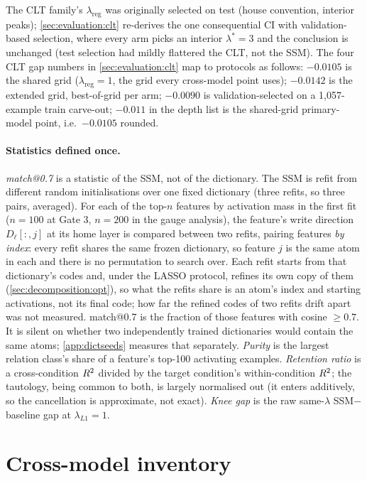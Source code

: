 The CLT
family's $\lambda_{\mathrm{reg}}$ was originally selected on test (house
convention, interior peaks); \cref{sec:evaluation:clt} re-derives the one
consequential CI with validation-based selection, where every arm picks an
interior $\lambda^{*}{=}3$ and the conclusion is unchanged (test selection had
mildly flattered the CLT, not the SSM). The four CLT gap numbers in
\cref{sec:evaluation:clt} map to protocols as follows: $-0.0105$ is the shared
grid ($\lambda_{\mathrm{reg}}{=}1$, the grid every cross-model point uses);
$-0.0142$ is the extended grid, best-of-grid per arm; $-0.0090$ is
validation-selected on a 1{,}057-example train carve-out; $-0.011$ in the
depth list is the shared-grid primary-model point, i.e.\ $-0.0105$ rounded.

\paragraph{Statistics defined once.}
\emph{match@0.7} is a statistic of the SSM, not of the dictionary. The SSM is
refit from different random initialisations over one fixed dictionary (three
refits, so three pairs, averaged). For each of the top-$n$ features by
activation mass in the first fit ($n = 100$ at Gate 3, $n = 200$ in the gauge
analysis), the feature's write direction $D_\ell[:, j]$ at its home layer is
compared between two refits, pairing features \emph{by index}: every refit
shares the same frozen dictionary, so feature $j$ is the same atom in each
and there is no permutation to search over. Each refit starts from that
dictionary's codes and, under the LASSO protocol, refines its own copy of
them (\cref{sec:decomposition:opt}), so what the refits share is an atom's
index and starting activations, not its final code; how far the refined
codes of two refits drift apart was not measured. match@0.7 is the fraction
of those features with cosine $\ge 0.7$. It is silent on whether two
independently trained dictionaries would contain the same atoms;
\cref{app:dictseeds} measures that separately.
\emph{Purity} is the largest relation class's share of a feature's top-100
activating examples. \emph{Retention ratio} is a cross-condition $R^2$
divided by the target condition's within-condition $R^2$; the tautology,
being common to both, is largely normalised out (it enters additively, so
the cancellation is approximate, not exact). \emph{Knee gap} is the raw same-$\lambda$
SSM$-$baseline gap at $\lambda_{L1}{=}1$.

\section{Cross-model inventory}
\label{app:crossmodel}

